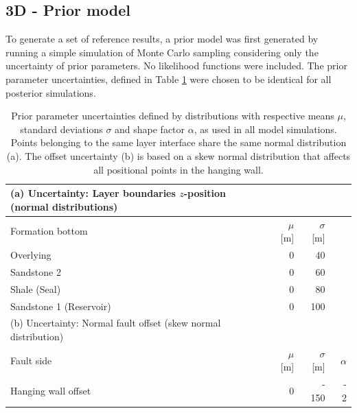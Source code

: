 		\subsection{3D - Prior model}\label{sec:prior_model3D}
		To generate a set of reference results, a prior model was first generated by running a simple simulation of Monte Carlo sampling considering only the uncertainty of prior parameters. No likelihood functions were included. The prior parameter uncertainties, defined in Table \ref{tab:3D_prior_parameters} were chosen to be identical for all posterior simulations.
		\begin{table}[h]
		\centering
		\begin{tabular}{lrrr} 
			\toprule
			(a) Uncertainty: Layer boundaries $z$-position (normal distributions)\\  
			\midrule 
			Formation bottom & $\mu$ [m] & $\sigma$ [m]\\ 
			\midrule 
			Overlying & 0 & 40 \\
			Sandstone 2 & 0 & 60 \\
			Shale (Seal) & 0 & 80\\ 
			Sandstone 1 (Reservoir) & 0 & 100 \\
			\bottomrule
			\toprule
			(b) Uncertainty: Normal fault offset (skew normal distribution)\\
			\midrule
			Fault side & $\mu$ [m] & $\sigma$ [m] & $\alpha$\\
			\midrule
			Hanging wall offset & 0 & -~150 & -~2\\
			\bottomrule 
		\end{tabular}
		\caption{Prior parameter uncertainties defined by distributions with respective means $\mu$, standard deviations $\sigma$ and shape factor $\alpha$, as used in all model simulations. Points belonging to the same layer interface share the same normal distribution (a). The offset uncertainty (b) is based on a skew normal distribution that affects all positional points in the hanging wall.}
		\label{tab:3D_prior_parameters}
		\end{table}
